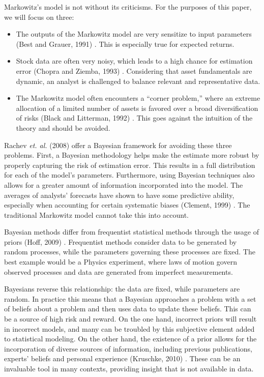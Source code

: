 \documentclass[a4paper]{article}\usepackage[]{graphicx}\usepackage[]{color}
\begin{document}
Markowitz's model is not without its criticisms. For the purposes of this paper, we will focus on three:

\begin{itemize}
    \item The outputs of the Markowitz model are very sensitize to input parameters (Best and Grauer, 1991) \cite{best91}. This is especially true for expected returns.
    \item Stock data are often very noisy, which leads to a high chance for estimation error (Chopra and Ziemba, 1993) \cite{chopra93}. Considering that asset fundamentals are dynamic, an analyst is challenged to balance relevant and representative data. 
    \item The Markowitz model often encounters a ``corner problem,'' where an extreme allocation of a limited number of assets is favored over a broad diversification of risks (Black and Litterman, 1992) \cite{black92}. This goes against the intuition of the theory and should be avoided.
\end{itemize}

Rachev \textit{et. al.} (2008) \cite{rachev08} offer a Bayesian framework for avoiding these three problems. First, a Bayesian methodology helps make the estimate more robust by properly capturing the risk of estimation error. This results in a full distribution for each of the model's parameters. Furthermore, using Bayesian techniques also allows for a greater amount of information incorporated into the model. The averages of analysts' forecasts have shown to have some predictive ability, especially when accounting for certain systematic biases (Clement, 1999) \cite{clement99}. The traditional Markowitz model cannot take this into account.

Bayesian methods differ from frequentist statistical methods through the usage of priors (Hoff, 2009) \cite{hoff09}. Frequentist methods consider data to be generated by random processes, while the parameters governing these processes are fixed. The best example would be a Physics experiment, where laws of motion govern observed processes and data are generated from imperfect measurements.

Bayesians reverse this relationship: the data are fixed, while parameters are random. In practice this means that a Bayesian approaches a problem with a set of beliefs about a problem and then uses data to update these beliefs. This can be a source of high risk and reward. On the one hand, incorrect priors will result in incorrect models, and many can be troubled by this subjective element added to statistical modeling. On the other hand, the existence of a prior allows for the incorporation of diverse sources of information, including previous publications, experts' beliefs and personal experience (Kruschke, 2010) \cite{kruschke, 2010}. These can be an invaluable tool in many contexts, providing insight that is not available in data.
\end{document}
